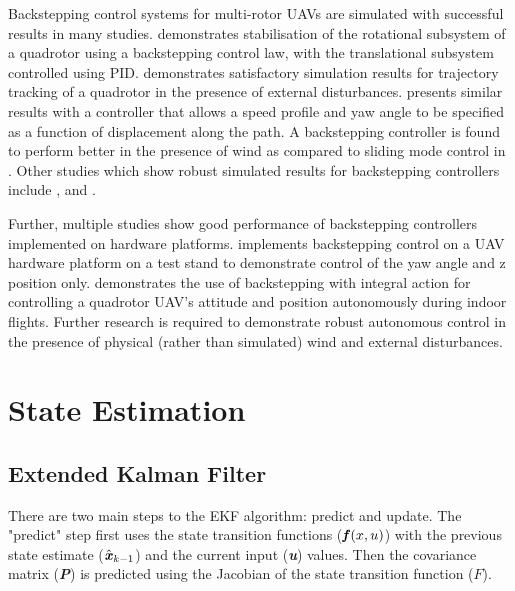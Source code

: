 Backstepping control systems for multi-rotor UAVs are simulated with successful results in many studies. \cite{Mian2008} demonstrates stabilisation of the rotational subsystem of a quadrotor using a backstepping control law, with the translational subsystem controlled using PID. \cite{ArellanoMuro2013} demonstrates satisfactory simulation results for trajectory tracking of a quadrotor in the presence of external disturbances. \cite{Roza2012} presents similar results with a controller that allows a speed profile and yaw angle to be specified as a function of displacement along the path. A backstepping controller is found to perform better in the presence of wind as compared to sliding mode control in \cite{Moussid2015}. Other studies which show robust simulated results for backstepping controllers include \cite{Madani2006}, \cite{XuanMung2019} and \cite{Shao2018}.

Further, multiple studies show good performance of backstepping controllers implemented on hardware platforms. \cite{Madani2006a} implements backstepping control on a UAV hardware platform on a test stand to demonstrate control of the yaw angle and z position only. \cite{Bouabdallah2006} demonstrates the use of backstepping with integral action for controlling a quadrotor UAV's attitude and position autonomously during indoor flights. Further research is required to demonstrate robust autonomous control in the presence of physical (rather than simulated) wind and external disturbances. 



\section{State Estimation}





\subsection{Extended Kalman Filter}\label{section:EKFBackground}
There are two main steps to the EKF algorithm: predict and update.
The "predict" step first uses the state transition functions ($\textbf{\textit{f}}(x,u)$) with the previous state estimate ($\hat{\textbf{\textit{x}}}_{k-1}$) and the current input (\textbf{\textit{u}}) values. Then the covariance matrix (\textbf{\textit{P}}) is predicted using the Jacobian of the state transition function ($F$).

